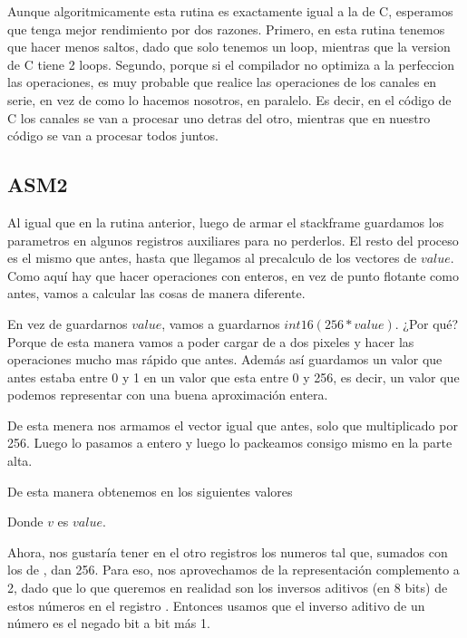 Aunque algoritmicamente esta rutina es exactamente igual a la de C, esperamos que tenga mejor rendimiento por dos razones.
Primero, en esta rutina tenemos que hacer menos saltos, dado que solo tenemos un loop, mientras que la version de C tiene 2 loops.
Segundo, porque si el compilador no optimiza a la perfeccion las operaciones, es muy probable que realice las operaciones de los canales en serie, en vez de como lo hacemos nosotros, en paralelo.
Es decir, en el código de C los canales se van a procesar uno detras del otro, mientras que en nuestro código se van a procesar todos juntos.


\subsection{ASM2}

Al igual que en la rutina anterior, luego de armar el stackframe guardamos los parametros en algunos registros auxiliares para no perderlos. El resto del proceso es el mismo que antes, hasta que llegamos al precalculo de los vectores de $value$. Como aquí hay que hacer operaciones con enteros, en vez de punto flotante como antes, vamos a calcular las cosas de manera diferente.

En vez de guardarnos $value$, vamos a guardarnos $int16(256*value)$. ¿Por qué? Porque de esta manera vamos a poder cargar de a dos pixeles y hacer las operaciones mucho mas rápido que antes. Además así guardamos un valor que antes estaba entre 0 y 1 en un valor que esta entre 0 y 256, es decir, un valor que podemos representar con una buena aproximación entera.

De esta menera nos armamos el vector igual que antes, solo que multiplicado por 256. Luego lo pasamos a entero y luego lo packeamos consigo mismo en la parte alta.

De esta manera obtenemos en  los siguientes valores



Donde $v$ es $value$.


Ahora, nos gustaría tener en el otro registros los numeros tal que, sumados con los de , dan 256. Para eso, nos aprovechamos de la representación complemento a 2, dado que lo que queremos en realidad son los inversos aditivos (en 8 bits) de estos números en el registro . Entonces usamos que el inverso aditivo de un número es el negado bit a bit más 1.


